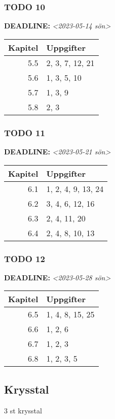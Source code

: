 \documentclass[11pt]{article}
\begin{document}
\subsubsection{{\bfseries\sffamily TODO} 10}
\label{sec:org73395b7}
\noindent\textbf{DEADLINE:} \textit{<2023-05-14 sön>}\\[0pt]

\begin{center}
\begin{tabular}{rl}
Kapitel & Uppgifter\\[0pt]
\hline
5.5 & 2, 3, 7, 12, 21\\[0pt]
5.6 & 1, 3, 5, 10\\[0pt]
5.7 & 1, 3, 9\\[0pt]
5.8 & 2, 3\\[0pt]
\end{tabular}
\end{center}

\subsubsection{{\bfseries\sffamily TODO} 11}
\label{sec:org669a741}
\noindent\textbf{DEADLINE:} \textit{<2023-05-21 sön>}\\[0pt]

\begin{center}
\begin{tabular}{rl}
Kapitel & Uppgifter\\[0pt]
\hline
6.1 & 1, 2, 4, 9, 13, 24\\[0pt]
6.2 & 3, 4, 6, 12, 16\\[0pt]
6.3 & 2, 4, 11, 20\\[0pt]
6.4 & 2, 4, 8, 10, 13\\[0pt]
\end{tabular}
\end{center}

\subsubsection{{\bfseries\sffamily TODO} 12}
\label{sec:orgb78b2ca}
\noindent\textbf{DEADLINE:} \textit{<2023-05-28 sön>}\\[0pt]

\begin{center}
\begin{tabular}{rl}
Kapitel & Uppgifter\\[0pt]
\hline
6.5 & 1, 4, 8, 15, 25\\[0pt]
6.6 & 1, 2, 6\\[0pt]
6.7 & 1, 2, 3\\[0pt]
6.8 & 1, 2, 3, 5\\[0pt]
\end{tabular}
\end{center}

\subsection{Krysstal}
\label{sec:orgd00e847}
3 st krysstal
\end{document}
